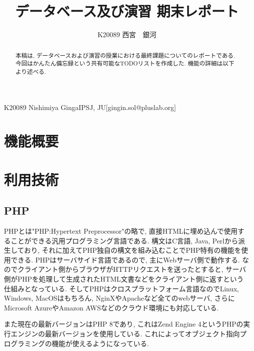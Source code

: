 \documentclass[submit,techrep]{ipsj}
\begin{document}

\title{データベース及び演習 期末レポート\\}

\author{K20089 西宮　銀河}{K20089 Nishimiya Ginga}{IPSJ, JU}[gingin.sol@pluslab.org]

\begin{abstract}
本稿は, データベースおよび演習の授業における最終課題についてのレポートである. 
今回はかんたん備忘録という共有可能なTODOリストを作成した. 機能の詳細は以下より述べる.
\end{abstract}

\maketitle

\section{機能概要}



\section{利用技術}

\subsection{PHP}
PHPとは"PHP:Hypertext Preprocessor"の略で, 直接HTMLに埋め込んで使用することができる汎用プログラミング言語である. 
構文はC言語, Java, Perlから派生しており, それに加えてPHP独自の構文を組み込むことでPHP特有の機能を使用できる. 
PHPはサーバサイド言語であるので, 主にWebサーバ側で動作する. 
なのでクライアント側からブラウザがHTTPリクエストを送ったとすると, サーバ側がPHPを処理して生成されたHTML文書などをクライアント側に返すという仕組みとなっている. 
そしてPHPはクロスプラットフォーム言語なのでLinux, Windows, MacOSはもちろん, NginXやApacheなど全てのwebサーバ, さらにMicrosoft AzureやAmazon AWSなどのクラウド環境にも対応している. 

また現在の最新バージョンはPHP 8であり, これはZend Engine 4というPHPの実行エンジンの最新バージョンを使用している. これによってオブジェクト指向プログラミングの機能が使えるようになっている. 
\end{document}
